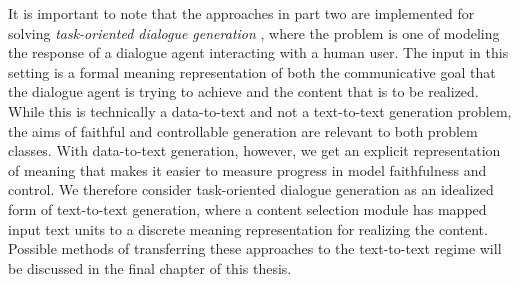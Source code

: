 It is important to note that the approaches in part two are implemented for
solving \textit{task-oriented dialogue generation} \citep{mairesse2010}, where
the problem is one of modeling the response of a dialogue agent interacting
with a human user. The input in this setting is a formal meaning
representation of both the communicative goal that the dialogue agent is
trying to achieve and the content that is to be realized. While this is
technically a data-to-text and not a text-to-text generation problem, the aims
of faithful and controllable generation are relevant to both problem classes.
With data-to-text generation, however, we get an explicit representation of
meaning that makes it easier to measure progress in model faithfulness and
control. We therefore consider task-oriented dialogue generation as an
idealized form of text-to-text generation, where a content selection module
has mapped input text units to a discrete meaning representation for realizing
the content.  Possible methods of transferring these approaches to the
text-to-text regime will be discussed in the final chapter of this thesis.
